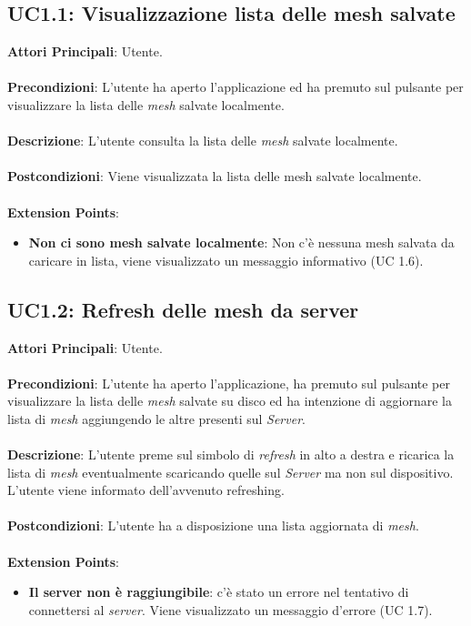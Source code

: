 \subsection{UC1.1: Visualizzazione lista delle mesh salvate}
\textbf{Attori Principali}: Utente.
\\\\ \textbf{Precondizioni}: L'utente ha aperto l'applicazione ed ha premuto sul pulsante per visualizzare la lista delle \emph{mesh} salvate localmente.
\\\\ \textbf{Descrizione}:  L'utente consulta la lista delle \emph{mesh} salvate localmente.
\\\\ \textbf{Postcondizioni}: Viene visualizzata la lista delle mesh salvate localmente.
\\\\ \textbf{Extension Points}:
\begin{itemize}
\item \textbf{Non ci sono mesh salvate localmente}: Non c'è nessuna mesh salvata da caricare in lista, viene visualizzato un messaggio informativo (UC 1.6).
\end{itemize}

\subsection{UC1.2: Refresh delle mesh da server}
\textbf{Attori Principali}: Utente.
\\\\ \textbf{Precondizioni}: L'utente ha aperto l'applicazione, ha premuto sul pulsante per visualizzare la lista delle \emph{mesh} salvate su disco ed ha intenzione di aggiornare la lista di \emph{mesh} aggiungendo le altre presenti sul \emph{Server}.
\\\\ \textbf{Descrizione}: L'utente preme sul simbolo di \emph{refresh} in alto a destra e ricarica la lista di \emph{mesh} eventualmente scaricando quelle sul \emph{Server} ma non sul dispositivo. L'utente viene informato dell'avvenuto refreshing.
\\\\ \textbf{Postcondizioni}: L'utente ha a disposizione una lista aggiornata di \emph{mesh}.
\\\\ \textbf{Extension Points}:
\begin{itemize}
\item \textbf{Il server non è raggiungibile}: c'è stato un errore nel tentativo di connettersi al \emph{server}. Viene visualizzato un messaggio d'errore (UC 1.7).
\end{itemize}

